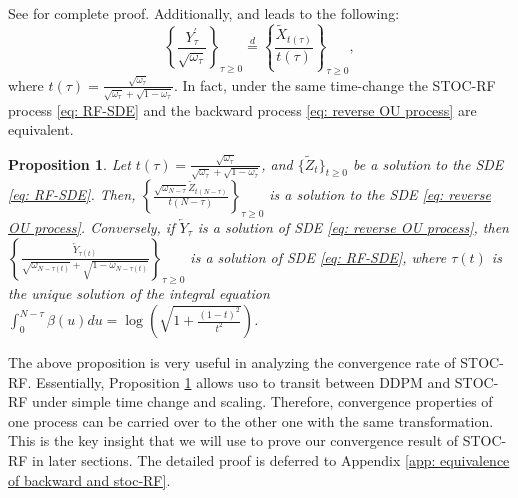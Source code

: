 \documentclass{article}
\theoremstyle{plain}
\newtheorem{proposition}[theorem]{Proposition}
\theoremstyle{definition}
\theoremstyle{remark}
\newcommand{\red}[1]{{\color{red}#1}}
\newcommand{\bc}[1]{\left\{{#1}\right\}}
\newcommand{\br}[1]{\left({#1}\right)}
\begin{document}
See  for complete proof. Additionally,  and  leads to the following:
\begin{equation}
    \label{eq: DDPM and RF equivalent}
    \bc{\frac{Y^{'}_{\tau}}{\sqrt{\omega_{\tau}}}}_{\tau \ge 0} \overset{d}{=} \bc{\frac{\tilde X_{t(\tau)}}{t(\tau)}}_{\tau \ge 0},
\end{equation}
where $t(\tau) = \frac{\sqrt{\omega_\tau}}{\sqrt{\omega_\tau} + \sqrt{1 - \omega_{\tau}}}$. In fact, under the same time-change the STOC-RF process \eqref{eq: RF-SDE} and the backward process \eqref{eq: reverse OU process} are equivalent.
\begin{proposition}
    \label{prop: RF-SDE and backwrd process are equivalent}
    Let $t(\tau) = \frac{\sqrt{\omega_\tau}}{\sqrt{\omega_\tau} + \sqrt{1 - \omega_{\tau}}}$, and $\{\tilde Z_t\}_{t\ge 0}$ be a solution to the SDE \eqref{eq: RF-SDE}. Then,  
    $\bc{\frac{\sqrt{\omega_{N-\tau}}\tilde Z_{t(N - \tau)}}{t(N - \tau)}}_{\tau\ge 0}$ is a solution to the SDE \eqref{eq: reverse OU process}. Conversely, if $\overleftarrow Y_\tau$ is a solution of SDE \eqref{eq: reverse OU process}, then $\bc{\frac{ \overleftarrow Y_{\tau(t)}}{\sqrt{\omega_{N-\tau(t)}} + \sqrt{1 - \omega_{N - \tau(t)}}}}_{\tau\ge 0}$ is a solution of SDE \eqref{eq: RF-SDE}, where $\tau(t)$ is the unique solution of the integral equation $\int_{0}^{N-\tau} \beta(u) du = \log\br{\sqrt{1  + \frac{(1-t)^2}{t^2}}}$.%
 \end{proposition}
The above proposition is very useful in analyzing the convergence rate of STOC-RF. Essentially, Proposition \ref{prop: RF-SDE and backwrd process are equivalent} allows uso to transit between DDPM and STOC-RF under simple time change and scaling. Therefore, convergence properties of one process can be carried over to the other one with the same transformation. This is the key insight that we will use to prove our convergence result of STOC-RF in later sections. The detailed proof is deferred to Appendix \ref{app: equivalence of backward and stoc-RF}.
\end{document}
